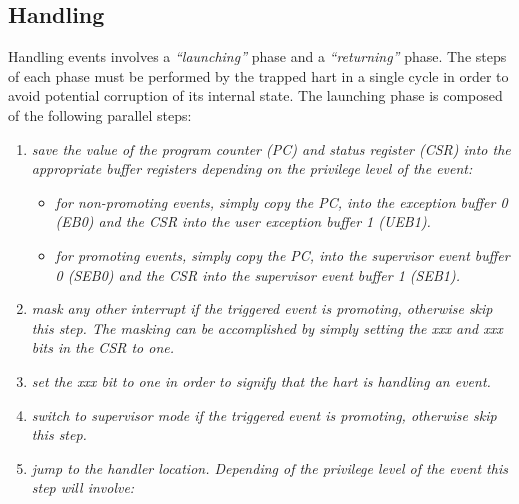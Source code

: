 \documentclass{article}
\begin{document}
        \subsection{Handling}

            Handling events involves a \textit{``launching''} phase and a \textit{``returning''} phase. The steps of each phase must be performed by the trapped hart in a single cycle in order to avoid potential corruption of its internal state. The launching phase is composed of the following parallel steps:

            \begin{enumerate}

                \item \textit{save the value of the program counter (PC) and status register (CSR) into the appropriate buffer registers depending on the privilege level of the event:}

                    \begin{itemize}

                        \item \textit{for non-promoting events, simply copy the PC, into the exception buffer 0 (EB0) and the CSR into the user exception buffer 1 (UEB1).}

                        \item \textit{for promoting events, simply copy the PC, into the supervisor event buffer 0 (SEB0) and the CSR into the supervisor event buffer 1 (SEB1).}

                    \end{itemize}

                \item \textit{mask any other interrupt if the triggered event is promoting, otherwise skip this step. The masking can be accomplished by simply setting the xxx and xxx bits in the CSR to one.}

                \item \textit{set the xxx bit to one in order to signify that the hart is handling an event.}

                \item \textit{switch to supervisor mode if the triggered event is promoting, otherwise skip this step.}

                \item \textit{jump to the handler location. Depending of the privilege level of the event this step will involve:}

                    \begin{itemize}


\end{itemize}
\end{enumerate}
\end{document}
